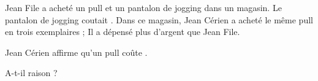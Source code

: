 \begin{exercice*}
    Jean File a acheté un pull et un pantalon de jogging dans un magasin.
    Le pantalon de jogging coutait . Dans ce magasin, Jean Cérien a acheté le même 
    pull en trois exemplaires ; Il a dépensé plus d'argent que Jean File.

    Jean Cérien affirme qu'un pull coûte .

    A-t-il raison ?
\end{exercice*}
 

